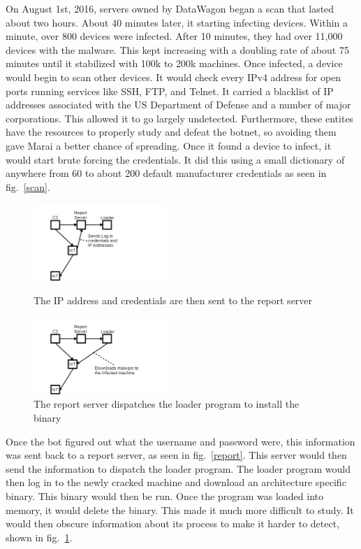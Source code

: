 \documentclass[conference]{IEEEtran}
\begin{document}
On August 1st, 2016, servers owned by DataWagon began a scan that lasted about two hours. About 40 minutes later, it starting infecting devices. Within a minute, over 800 devices were infected. After 10 minutes, they had over 11,000 devices with the malware. This kept increasing with a doubling rate of about 75 minutes until it stabilized with 100k to 200k machines. Once infected, a device would begin to scan other devices. It would check every IPv4 address for open ports running services like SSH, FTP, and Telnet. It carried a blacklist of IP addresses associated with the US Department of Defense and a number of major corporations. This allowed it to go largely undetected. Furthermore, these entites have the resources to properly study and defeat the botnet, so avoiding them gave Marai a better chance of spreading. Once it found a device to infect, it would start brute forcing the credentials. It did this using a small dictionary of anywhere from 60 to about 200 default manufacturer credentials as seen in fig.~\ref{scan}. 

 \begin{figure}[t]
\centerline{\includegraphics[width=0.45\textwidth]{../fig2.png}}
\caption{The IP address and credentials are then sent to the report server}
\label{report}
\centerline{\includegraphics[width=0.45\textwidth]{../fig3.png}}
\caption{The report server dispatches the loader program to install the binary}
\label{loader}
\end{figure}

Once the bot figured out what the username and password were, this information was sent back to a report server, as seen in fig.~\ref{report}. This server would then send the information to dispatch the loader program. The loader program would then log in to the newly cracked machine and download an architecture specific binary. This binary would then be run. Once the program was loaded into memory, it would delete the binary. This made it much more difficult to study. It would then obscure information about its process to make it harder to detect, shown in fig.~\ref{loader}.
\end{document}

